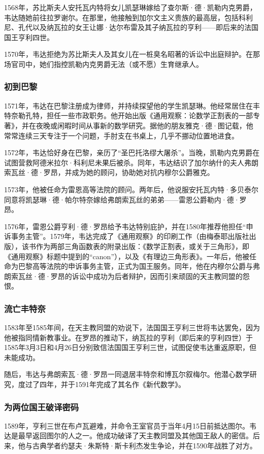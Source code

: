 1568年，苏比斯夫人安托瓦内特将女儿凯瑟琳嫁给了查尔斯·德·凯勒内克男爵，韦达随她前往拉罗谢尔。在那里，他接触到加尔文主义贵族的最高层，包括科利尼、孔代以及纳瓦拉的女王让娜·达尔布雷及其子纳瓦拉的亨利——即后来的法国国王亨利四世。

1570年，韦达拒绝为苏比斯夫人及其女儿在一桩臭名昭著的诉讼中出庭辩护。在那场官司中，她们指控凯勒内克男爵无法（或不愿）生育继承人。
\subsubsection{初到巴黎}
1571年，韦达在巴黎注册成为律师，并持续探望他的学生凯瑟琳。他经常居住在丰特奈勒孔特，担任一些市政职务。他开始出版《通用观察：论数学正割表的一部专著》，并在夜晚或闲暇时间从事新的数学研究。据他的朋友雅克·德·图记载，他常常连续三天专注于一个问题，手肘支在书桌上，几乎不挪动位置地进食。

1572年，韦达恰好身在巴黎，亲历了“圣巴托洛缪大屠杀”。当晚，凯勒内克男爵在试图营救阿德米拉尔·科利尼未果后被杀。同年，韦达结识了加尔纳什的夫人弗朗索瓦丝·德·罗昂，并成为她的顾问，协助她对抗内穆尔公爵雅克。

1573年，他被任命为雷恩高等法院的顾问。两年后，他说服安托瓦内特·多贝泰尔同意将凯瑟琳·德·帕尔特奈嫁给弗朗索瓦丝的弟弟——雷恩公爵勒内·德·罗昂。

1576年，雷恩公爵亨利·德·罗昂给予韦达特别庇护，并在1580年推荐他担任“申诉事务主管”。1579年，韦达完成了《通用观察》的印刷工作（由梅泰耶出版社出版），该书作为两部三角函数表的附录出版：《数学正割表，或关于三角形》，即《通用观察》标题中提到的“canon”），以及《有理边三角形表》。一年后，他被任命为巴黎高等法院的申诉事务主管，正式为国王服务。同年，他在内穆尔公爵与弗朗索瓦丝·德·罗昂的诉讼中成功为后者辩护，因而引来顽固的天主教同盟的怨恨。
\subsubsection{流亡丰特奈}
1583年至1585年间，在天主教同盟的劝说下，法国国王亨利三世将韦达罢免，因为他被指同情新教事业。在罗昂的推动下，纳瓦拉的亨利（即后来的亨利四世）于1585年3月3日和4月26日分别致信法国国王亨利三世，试图促使韦达重返原职，但未能成功。

随后，韦达与弗朗索瓦·德·罗昂一同退居丰特奈和博瓦尔叙梅尔。他潜心数学研究，度过了四年，并于1591年完成了其名作《新代数学》。
\subsubsection{为两位国王破译密码}
1589年，亨利三世在布卢瓦避难，并命令王室官员于当年4月15日前抵达图尔。韦达是最早返回图尔的人之一。他成功破译了天主教同盟及其他国王敌人的密信。后来，他与古典学者约瑟夫·朱斯特·斯卡利杰发生争论，并在1590年战胜了对方。

